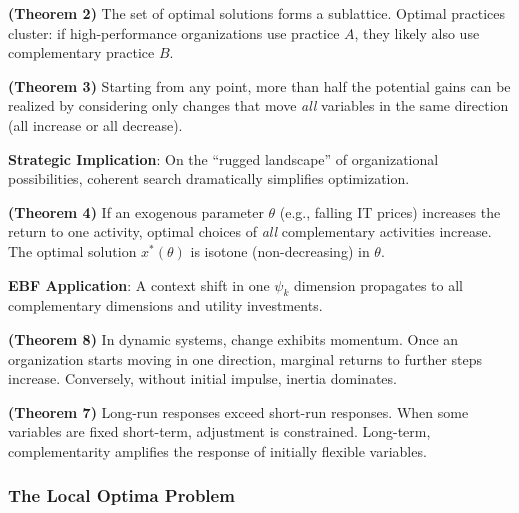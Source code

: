 \begin{theorem}
\label{thm:clustering}
\textbf{(Theorem 2)} The set of optimal solutions forms a sublattice. Optimal 
practices cluster: if high-performance organizations use practice $A$, they 
likely also use complementary practice $B$.
\end{theorem}

\begin{theorem}
\label{thm:coherent-search}
\textbf{(Theorem 3)} Starting from any point, more than half the potential gains 
can be realized by considering only changes that move \emph{all} variables in 
the same direction (all increase or all decrease).
\end{theorem}

\textbf{Strategic Implication}: On the ``rugged landscape'' of organizational 
possibilities, coherent search dramatically simplifies optimization.

\begin{theorem}
\label{thm:mcs-org}
\textbf{(Theorem 4)} If an exogenous parameter $\theta$ (e.g., falling IT prices) 
increases the return to one activity, optimal choices of \emph{all} complementary 
activities increase. The optimal solution $x^*(\theta)$ is isotone (non-decreasing) 
in $\theta$.
\end{theorem}

\textbf{EBF Application}: A context shift in one $\psi_k$ dimension propagates 
to all complementary dimensions and utility investments.

\begin{theorem}
\label{thm:momentum}
\textbf{(Theorem 8)} In dynamic systems, change exhibits momentum. Once an 
organization starts moving in one direction, marginal returns to further steps 
increase. Conversely, without initial impulse, inertia dominates.
\end{theorem}

\begin{theorem}
\label{thm:lechatelier}
\textbf{(Theorem 7)} Long-run responses exceed short-run responses. When some 
variables are fixed short-term, adjustment is constrained. Long-term, complementarity 
amplifies the response of initially flexible variables.
\end{theorem}

\subsubsection{The Local Optima Problem}

